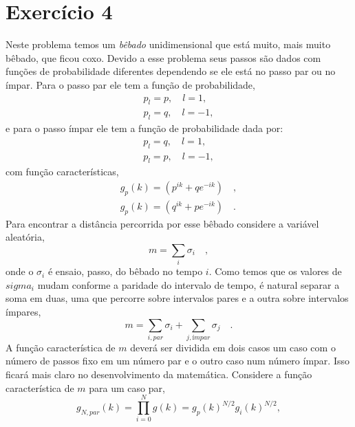 \documentclass[12pt]{article}
\begin{document}
\section*{Exercício 4}
Neste problema temos um \textit{bêbado} unidimensional que está muito, mais muito bêbado, que ficou coxo. Devido a esse problema seus passos são dados com funções de probabilidade diferentes dependendo se ele está no passo par ou no ímpar. Para o passo par ele tem a função de probabilidade,
\begin{equation}
\begin{split}
p_l = p, \quad l=1,\\
p_l = q, \quad l=-1,
\end{split}
\end{equation} 
e para o passo ímpar ele tem a função de probabilidade dada por:
\begin{equation}
\begin{split}
p_l = q, \quad l=1,\\
p_l = p, \quad l=-1,
\end{split}
\end{equation}
com função características,
\begin{equation}
\begin{split}
g_p(k) = (p^{ik} + qe^{-ik}) \quad, \\
g_p(k) = (q^{ik} + pe^{-ik}) \quad.
\end{split}
\end{equation}
Para encontrar a distância percorrida por esse bêbado considere a variável aleatória,
\begin{equation}
m = \sum_i \sigma_i \quad,
\end{equation}
onde o $\sigma_i$ é ensaio, passo, do bêbado no tempo $i$. Como temos que os valores de $sigma_i$ mudam conforme a paridade do intervalo de tempo, é natural separar a soma em duas, uma que percorre sobre intervalos pares e a outra sobre intervalos ímpares,
\begin{equation}
m = \sum_{i, par} \sigma_i + \sum_{j, ímpar}\sigma_j\quad. 
\end{equation}
A função característica de $m$ deverá ser dividida em dois casos um caso com o número de passos fixo em um número par e o outro caso num número ímpar. Isso ficará mais claro no desenvolvimento da matemática. Considere a função característica de $m$ para um caso par,
\begin{equation}
g_{N,par}(k) = \prod\limits_{i=0}^N g(k) = g_p(k)^{N/2}g_i(k)^{N/2}, 
\end{equation}
\end{document}
